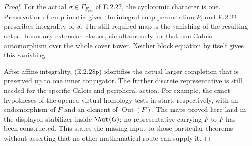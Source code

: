 \begin{proof}
For the actual \(\sigma\in\Gamma_{F_{\mathrm{cm}}}\) of
E.2.22, the cyclotomic character is one. Preservation of
cusp inertia gives the integral cusp permutation \(P\),
and E.2.22 prescribes integrality of \(S\). The still
required map is the vanishing of the resulting actual
boundary-extension classes, simultaneously for that one
Galois automorphism over the whole cover tower. Neither
block equation by itself gives this vanishing.

After affine integrality, (E.2.28p) identifies the actual
larger completion that is preserved up to one inner
conjugator. The further discrete representative is still
needed for the specific Galois and peripheral action.
For example, the exact hypotheses of the opened virtual
homology tests in \cite[Theorem~1.2, p.~3; Theorem~1.5,
p.~4]{GenYuksel2025} start, respectively, with an
endomorphism of \(F\) and an element of \(\operatorname{Out}(F)\).
The maps proved here land in the displayed stabilizer
inside \(\Aut(G)\); no representative carrying \(F\)
to \(F\) has been constructed. This states the missing
input to those particular theorems without asserting
that no other mathematical route can supply it.
\end{proof}


